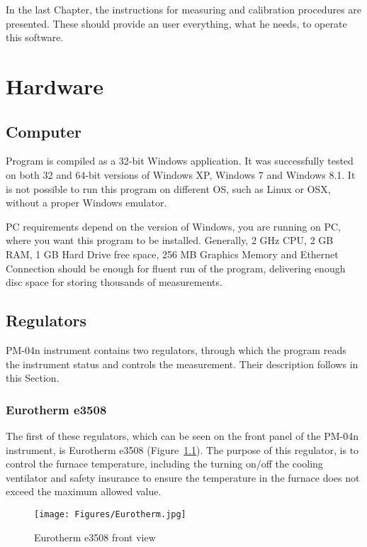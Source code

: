 \documentclass[a4paper,11pt,twoside]{book}
\theoremstyle{named}
\begin{document}
In the last Chapter, the instructions for measuring and calibration procedures
are presented. These should provide an user everything, what he needs, to operate
this software.


\chapter{Hardware}
\label{ch:Hardware}

\section{Computer}

Program is compiled as a 32-bit Windows application. It was successfully tested
on both 32 and 64-bit versions of Windows XP, Windows 7 and Windows 8.1. It is
not possible to run this program on different OS, such as Linux or OSX, without
a proper Windows emulator.

PC requirements depend on the version of Windows, you are running on PC,
where you want this program to be installed. Generally, 2 GHz CPU, 2 GB RAM,
1 GB Hard Drive free space, 256 MB Graphics Memory and Ethernet Connection
should be enough for fluent run of the program, delivering enough disc space for
storing thousands of measurements. 

\section{Regulators}

PM-04n instrument contains two regulators, through which the program reads the
instrument status and controls the measurement. Their description follows in
this Section.

\subsection{Eurotherm e3508}
\label{sec:Eurotherm}

The first of these regulators, which can be seen on the front panel of the
PM-04n instrument, is Eurotherm e3508 (Figure~\ref{fig:e3508Front}). The purpose
of this regulator, is to control the furnace temperature, including the turning
on/off the cooling ventilator and safety insurance to ensure the temperature in
the furnace does not exceed the maximum allowed value. 

\begin{figure}[t]
  \centering
  \texttt{[image: Figures/Eurotherm.jpg]}
  \caption{Eurotherm e3508 front view}
  \label{fig:e3508Front}
\end{figure}
\end{document}
